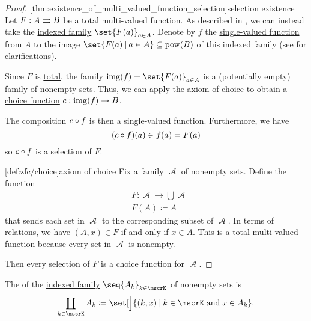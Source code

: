 \begin{proof}
  [thm:existence_of_multi_valued_function_selection]{selection existence} Let \( F: A \rightrightarrows B \) be a total multi-valued function. As described in , we can instead take the \hyperref[def:cartesian_product/indexed_family]{indexed family} \( \set{ F(a) }_{a \in A} \). Denote by \( f \) the \hyperref[def:function]{single-valued function} from \( A \) to the image \( \set{ F(a) \given a \in A } \subseteq \pow(B) \) of this indexed family (see  for clarifications).

  Since \( F \) is \hyperref[def:multi_valued_function/total]{total}, the family \( \img(f) = \set{ F(a) }_{a \in A} \) is a (potentially empty) family of nonempty sets. Thus, we can apply the axiom of choice to obtain a \hyperref[def:choice_function]{choice function} \( c: \operatorname{img}(f) \to B \).

  The composition \( c \bincirc f \) is then a single-valued function. Furthermore, we have
  \begin{equation*}
    (c \bincirc f)(a) \in f(a) = F(a)
  \end{equation*}
  so \( c \bincirc f \) is a selection of \( F \).

  [def:zfc/choice]{axiom of choice} Fix a family \( \mscrA \) of nonempty sets. Define the function
  \begin{equation*}
    \begin{aligned}
      &F: \mscrA \to \bigcup \mscrA \\
      &F(A) \coloneqq A
    \end{aligned}
  \end{equation*}
  that sends each set in \( \mscrA \) to the corresponding subset of \( \mscrA \). In terms of relations, we have \( (A, x) \in F \) if and only if \( x \in A \). This is a total multi-valued function because every set in \( \mscrA \) is nonempty.

  Then every selection of \( F \) is a choice function for \( \mscrA \).
\end{proof}

\begin{definition}\label{def:disjoint_union}
  The  of the \hyperref[def:cartesian_product/indexed_family]{indexed family} \( \seq{ A_k }_{k \in \mscrK} \) of nonempty sets is
  \begin{equation*}
    \coprod_{k \in \mscrK} A_k \coloneqq \set[\Big]{ (k, x) \given k \in \mscrK \T{and} x \in A_k }.
  \end{equation*}
\end{definition}

